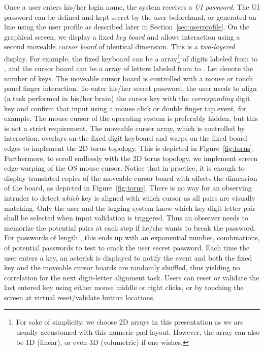 \documentclass[12pt,onecolumn]{article}
\begin{document}
Once a user enters his/her login name, the system receives a {\em UI password}.
The UI password can be defined and kept secret by the user beforehand, or generated on-line using the user profile as described later in Section~\ref{sec:userprofile}.
On the graphical screen, we display a fixed {\em key board} and allows interaction using a second  moveable {\em cursor board} of identical dimension.
This is a {\em two-layered} display.
For example, the fixed keyboard can be a  array\footnote{For sake of simplicity, we choose 2D arrays in this presentation as we are usually accustomed with this numeric pad layout. However, the array can also be  1D (linear), or even 3D (volumetric) if one wishes.} of digits labeled from  to , and the cursor board can be a  array of letters labeled from  to . 
Let  denote the number of keys.
The moveable cursor board is controlled with a mouse or touch panel finger interaction.
To enter his/her secret password, the user needs to align (a task performed in his/her brain) the cursor key with the {\em corresponding} digit key and confirm that input using a mouse click or double finger tap event, for example. 
The mouse cursor of the operating system is preferably hidden, but this is not a strict requirement.
The moveable cursor array, which is controlled by interaction, overlays on the fixed digit keyboard and warps on the fixed board edges to implement the 2D torus topology.
This is depicted in Figure~\ref{fig:torus}.
Furthermore, to scroll endlessly with the 2D torus topology, we implement screen edge warping of the OS mouse cursor.
Notice that in practice, it is enough to display  translated copies of the moveable cursor board with offsets the dimension of the board, as depicted in Figure~\ref{fig:torus}.
There is no way for an observing intruder to detect {\em which} key is aligned with which cursor as all pairs are visually matching.
Only the user and the logging system know which key digit-letter pair shall be selected when input validation is triggered.
Thus an observer needs to memorize the  potential pairs at each step if he/she wants to break the password.
For passwords of length , this ends up with an exponential number,  combinations, of potential passwords to test to crack the user secret password.
Each time the user enters a key, an asterisk is displayed to notify the event and both the fixed key  and the moveable cursor  boards are randomly shuffled, thus yielding no correlation for the next digit-letter alignment task.
Users can reset or validate the last entered key using either mouse middle or right clicks, or by touching the screen at virtual reset/validate button locations.
\end{document}
